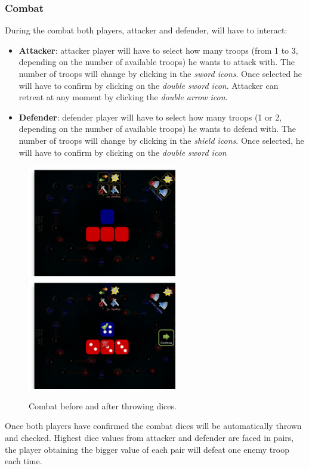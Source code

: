 \documentclass[12pt,a4paper]{article}
\begin{document}
\subsubsection{Combat}
During the combat both players, attacker and defender, will have to interact:

\begin{itemize}
\item {\bf Attacker}: attacker player will have to select how many troops (from 1 to 3, depending on the number of available troops) he wants to attack with. The number of troops will change by clicking in the {\it sword icons}. Once selected he will have to confirm by clicking on the {\it double sword icon}. Attacker can retreat at any moment by clicking the {\it double arrow icon}.
\item {\bf Defender}: defender player will have to select how many troops (1 or 2, depending on the number of available troops) he wants to defend with. The number of troops will change by clicking in the {\it shield icons}. Once selected, he will have to confirm by clicking on the {\it double sword icon}
\end{itemize}

\begin{figure}[h!]
\centering
\includegraphics[width=6.5cm]{pic/screenshot09.png}
\includegraphics[width=6.5cm]{pic/screenshot10.png}
\caption{Combat before and after throwing dices.}
\label{fig:combat}
\end{figure}

Once both players have confirmed the combat dices will be automatically thrown and checked. Highest dice values from attacker and defender are faced in pairs, the player obtaining the bigger value of each pair will defeat one enemy troop each time.
\end{document}
